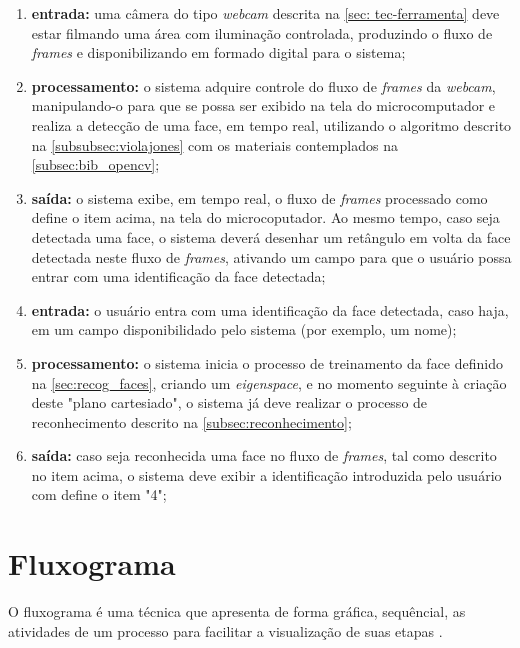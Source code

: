 \begin{enumerate}
	\item \textbf{entrada:} uma câmera do tipo \textit{webcam} descrita na \autoref{sec: tec-ferramenta} deve estar filmando uma área com iluminação controlada, produzindo o fluxo de \textit{frames} e disponibilizando em formado digital para o sistema;
	
	\item \textbf{processamento:} o sistema adquire controle do fluxo de \textit{frames} da \textit{webcam}, manipulando-o para que se possa ser exibido na tela do microcomputador e realiza a detecção de uma face, em tempo real, utilizando o algoritmo descrito na \autoref{subsubsec:violajones} com os materiais contemplados na \autoref{subsec:bib_opencv};
	
	\item \textbf{saída:} o sistema exibe, em tempo real, o fluxo de \textit{frames} processado como define o item acima, na tela do microcoputador. Ao mesmo tempo, caso seja detectada uma face, o sistema deverá desenhar um retângulo em volta da face detectada neste fluxo de \textit{frames}, ativando um campo para que o usuário possa entrar com uma identificação da face detectada;
	
	\item \textbf{entrada:} o usuário entra com uma identificação da face detectada, caso haja, em um campo disponibilidado pelo sistema (por exemplo, um nome);
	
	\item \textbf{processamento:} o sistema inicia o processo de treinamento da face definido na \autoref{sec:recog_faces}, criando um \textit{eigenspace}, e no momento seguinte à criação deste "plano cartesiado", o sistema já deve realizar o processo de reconhecimento descrito na \autoref{subsec:reconhecimento};
	
	\item \textbf{saída:} caso seja reconhecida uma face no fluxo de \textit{frames}, tal como descrito no item acima, o sistema deve exibir a identificação introduzida pelo usuário com define o item "4";
\end{enumerate}



\section{Fluxograma}\label{sec:fluxorec}

O fluxograma é uma técnica que apresenta de forma gráfica, sequêncial, as atividades de um processo para facilitar a visualização de suas etapas \cite{fluxogramalivro}.

